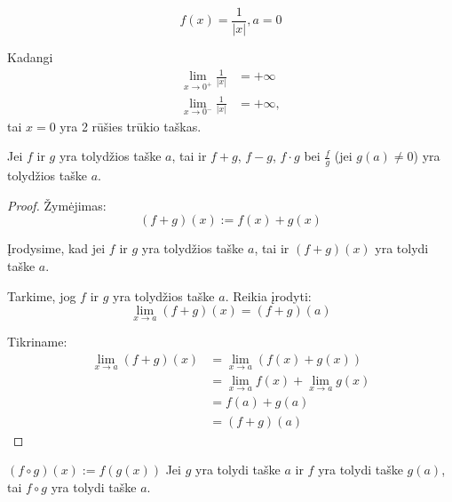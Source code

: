 \begin{exmp}
  \begin{equation*}
    f(x) = \frac{1}{|x|}, a = 0
  \end{equation*}

  Kadangi
  \begin{align*}
    \lim _{x \to 0^{+}} \frac{1}{|x|} &= +\infty \\
    \lim _{x \to 0^{-}} \frac{1}{|x|} &= +\infty,
  \end{align*}
  tai $x = 0$ yra 2 rūšies trūkio taškas.
\end{exmp}

\begin{prop}
  Jei $f$ ir $g$ yra tolydžios taške $a$, tai ir 
  $f + g$, $f - g$, $f \cdot g$ bei $\frac{f}{g}$ (jei $g(a) \neq 0$) 
  yra tolydžios taške $a$.

  \begin{proof}
    Žymėjimas:
    \begin{equation*}
      (f + g)(x) := f(x) + g(x)
    \end{equation*}

    Įrodysime, kad jei $f$ ir $g$ yra tolydžios taške $a$, tai ir 
    $(f + g)(x)$ yra tolydi taške $a$.

    Tarkime, jog $f$ ir $g$ yra tolydžios taške $a$. Reikia įrodyti:
    \begin{equation*}
      \lim _{x \to a} (f + g)(x) = (f + g)(a)
    \end{equation*}

    Tikriname:
    \begin{align*}
      \lim _{x \to a} (f + g)(x)
      &= \lim _{x \to a} (f(x) + g(x)) \\
      &= \lim _{x \to a} f(x) + \lim _{x \to a} g(x) \\
      &= f(a) + g(a) \\
      &= (f + g)(a)
    \end{align*}
  \end{proof}
\end{prop}

\begin{prop}
  $ (f \circ g)(x) := f(g(x))$ Jei $g$ yra tolydi taške $a$ ir 
  $f$ yra tolydi taške $g(a)$, tai $f \circ g$ yra tolydi taške $a$.
\end{prop}
